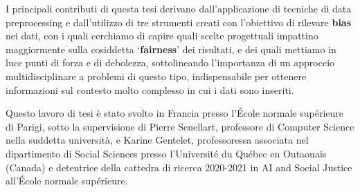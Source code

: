 I principali contributi di questa tesi derivano dall'applicazione di tecniche di data preprocessing e dall'utilizzo di tre strumenti creati con l'obiettivo di rilevare \textbf{bias} nei dati, con i quali cerchiamo di capire quali scelte progettuali impattino maggiormente sulla cosiddetta `\textbf{fairness}' dei risultati, e dei quali mettiamo in luce punti di forza e di debolezza, sottolineando l'importanza di un approccio multidisciplinare a problemi di questo tipo, indispensabile per ottenere informazioni sul contesto molto complesso in cui i dati sono inseriti.

Questo lavoro di tesi \`e stato svolto in Francia presso l'\'Ecole normale sup\'erieure di Parigi, sotto la supervisione di Pierre Senellart, professore di Computer Science nella suddetta universit\`a, e Karine Gentelet, professoressa associata nel dipartimento di Social Sciences presso l'Universit\'e du Qu\'ebec en Outaouais (Canada) e detentrice della cattedra di ricerca 2020-2021 in AI and Social Justice all'\'Ecole normale sup\'erieure.
